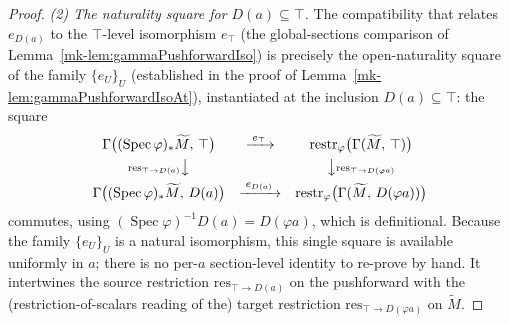 \begin{proof}
  \emph{(2) The naturality square for \(D(a) \subseteq \top\).} The compatibility
  that relates \(e_{D(a)}\) to the \(\top\)-level isomorphism
  \(e_\top\) (the global-sections comparison of
  Lemma~\ref{mk-lem:gammaPushforwardIso}) is precisely the open-naturality square of the
  family \(\{e_U\}_U\) (established in the proof of
  Lemma~\ref{mk-lem:gammaPushforwardIsoAt}), instantiated at the inclusion
  \(D(a) \subseteq \top\): the square
  \[
    \begin{array}{ccc}
      \Gamma\bigl((\operatorname{Spec}\varphi)_*\widetilde M,\, \top\bigr)
        & \xrightarrow{\;e_\top\;}
        & \operatorname{restr}_\varphi\bigl(\Gamma(\widetilde M,\, \top)\bigr) \\[4pt]
      {\scriptstyle \mathrm{res}_{\top \to D(a)}}\big\downarrow & &
        \big\downarrow{\scriptstyle \mathrm{res}_{\top \to D(\varphi a)}} \\[4pt]
      \Gamma\bigl((\operatorname{Spec}\varphi)_*\widetilde M,\, D(a)\bigr)
        & \xrightarrow{\;e_{D(a)}\;}
        & \operatorname{restr}_\varphi\bigl(\Gamma(\widetilde M,\, D(\varphi a))\bigr)
    \end{array}
  \]
  commutes, using \((\operatorname{Spec}\varphi)^{-1}D(a) = D(\varphi a)\), which is
  definitional. Because the family \(\{e_U\}_U\) is a natural isomorphism, this single
  square is available uniformly in \(a\); there is no per-\(a\) section-level identity
  to re-prove by hand. It intertwines the source restriction
  \(\mathrm{res}_{\top \to D(a)}\) on the pushforward with the (restriction-of-scalars
  reading of the) target restriction \(\mathrm{res}_{\top \to D(\varphi a)}\) on
  \(\widetilde M\).


\end{proof}
